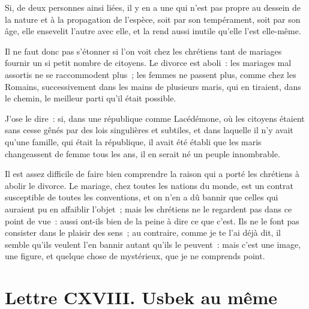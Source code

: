 \documentclass[french,twoside]{book} %
\newcommand{\dateline}[1]{\medskip{\RaggedLeft{#1}\par}\bigskip}
\begin{document}
Si, de deux personnes ainsi liées, il y en a une qui n’est pas propre au dessein de la nature et à la propagation de l’espèce, soit par son tempérament, soit par son âge, elle ensevelit l’autre avec elle, et la rend aussi inutile qu’elle l’est elle-même.\par
Il ne faut donc pas s’étonner si l’on voit chez les chrétiens tant de mariages fournir un si petit nombre de citoyens. Le divorce est aboli : les mariages mal assortis ne se raccommodent plus ; les femmes ne passent plus, comme chez les Romains, successivement dans les mains de plusieurs maris, qui en tiraient, dans le chemin, le meilleur parti qu’il était possible.\par
J’ose le dire : si, dans une république comme Lacédémone, où les citoyens étaient sans cesse gênés par des lois singulières et subtiles, et dans laquelle il n’y avait qu’une famille, qui était la république, il avait été établi que les maris changeassent de femme tous les ans, il en serait né un peuple innombrable.\par
Il est assez difficile de faire bien comprendre la raison qui a porté les chrétiens à abolir le divorce. Le mariage, chez toutes les nations du monde, est un contrat susceptible de toutes les conventions, et on n’en a dû bannir que celles qui auraient pu en affaiblir l’objet ; mais les chrétiens ne le regardent pas dans ce point de vue : aussi ont-ils bien de la peine à dire ce que c’est. Ils ne le font pas consister dans le plaisir des sens ; au contraire, comme je te l’ai déjà dit, il semble qu’ils veulent l’en bannir autant qu’ils le peuvent : mais c’est une image, une figure, et quelque chose de mystérieux, que je ne comprends point.\par

\dateline{De Paris, le 19 de la lune de Chahban, 1718.}
\section[{Lettre CXVIII. Usbek au même}]{Lettre CXVIII. Usbek au même}\renewcommand{\leftmark}{Lettre CXVIII. Usbek au même}
\end{document}
